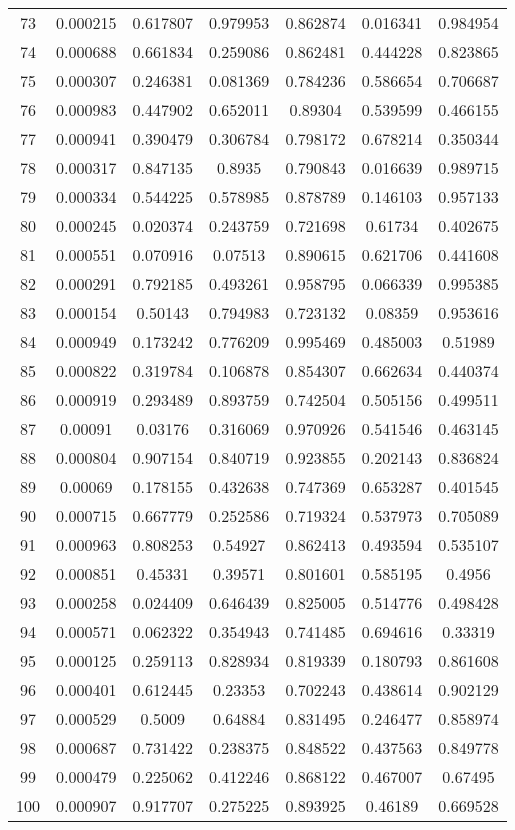 \begin{table}
\begin{tabular}{c|c|c|c|c|c|c}
73 & 0.000215 & 0.617807 & 0.979953 & 0.862874 & 0.016341 & 0.984954\\
74 & 0.000688 & 0.661834 & 0.259086 & 0.862481 & 0.444228 & 0.823865\\
75 & 0.000307 & 0.246381 & 0.081369 & 0.784236 & 0.586654 & 0.706687\\
76 & 0.000983 & 0.447902 & 0.652011 & 0.89304 & 0.539599 & 0.466155\\
77 & 0.000941 & 0.390479 & 0.306784 & 0.798172 & 0.678214 & 0.350344\\
78 & 0.000317 & 0.847135 & 0.8935 & 0.790843 & 0.016639 & 0.989715\\
79 & 0.000334 & 0.544225 & 0.578985 & 0.878789 & 0.146103 & 0.957133\\
80 & 0.000245 & 0.020374 & 0.243759 & 0.721698 & 0.61734 & 0.402675\\
81 & 0.000551 & 0.070916 & 0.07513 & 0.890615 & 0.621706 & 0.441608\\
82 & 0.000291 & 0.792185 & 0.493261 & 0.958795 & 0.066339 & 0.995385\\
83 & 0.000154 & 0.50143 & 0.794983 & 0.723132 & 0.08359 & 0.953616\\
84 & 0.000949 & 0.173242 & 0.776209 & 0.995469 & 0.485003 & 0.51989\\
85 & 0.000822 & 0.319784 & 0.106878 & 0.854307 & 0.662634 & 0.440374\\
86 & 0.000919 & 0.293489 & 0.893759 & 0.742504 & 0.505156 & 0.499511\\
87 & 0.00091 & 0.03176 & 0.316069 & 0.970926 & 0.541546 & 0.463145\\
88 & 0.000804 & 0.907154 & 0.840719 & 0.923855 & 0.202143 & 0.836824\\
89 & 0.00069 & 0.178155 & 0.432638 & 0.747369 & 0.653287 & 0.401545\\
90 & 0.000715 & 0.667779 & 0.252586 & 0.719324 & 0.537973 & 0.705089\\
91 & 0.000963 & 0.808253 & 0.54927 & 0.862413 & 0.493594 & 0.535107\\
92 & 0.000851 & 0.45331 & 0.39571 & 0.801601 & 0.585195 & 0.4956\\
93 & 0.000258 & 0.024409 & 0.646439 & 0.825005 & 0.514776 & 0.498428\\
94 & 0.000571 & 0.062322 & 0.354943 & 0.741485 & 0.694616 & 0.33319\\
95 & 0.000125 & 0.259113 & 0.828934 & 0.819339 & 0.180793 & 0.861608\\
96 & 0.000401 & 0.612445 & 0.23353 & 0.702243 & 0.438614 & 0.902129\\
97 & 0.000529 & 0.5009 & 0.64884 & 0.831495 & 0.246477 & 0.858974\\
98 & 0.000687 & 0.731422 & 0.238375 & 0.848522 & 0.437563 & 0.849778\\
99 & 0.000479 & 0.225062 & 0.412246 & 0.868122 & 0.467007 & 0.67495\\
100 & 0.000907 & 0.917707 & 0.275225 & 0.893925 & 0.46189 & 0.669528\\
\end{tabular}
\end{table}

